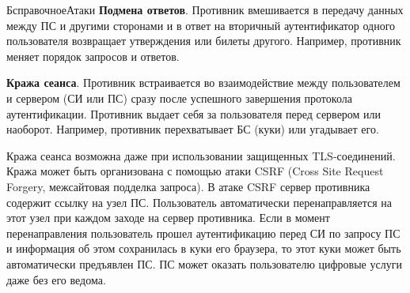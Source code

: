 \begin{appendix}{Б}{справочное}{Атаки}
{\bf Подмена ответов}.
Противник вмешивается в передачу данных между ПС и другими сторонами 
и в ответ на вторичный аутентификатор одного пользователя
возвращает утверждения или билеты другого.
%
Например, противник меняет порядок запросов и ответов.


{\bf Кража сеанса}. 
Противник встраивается во взаимодействие между пользователем 
и сервером (СИ или ПС) сразу после успешного завершения протокола 
аутентификации. Противник выдает себя за пользователя перед сервером 
или наоборот. 
%
Например, противник перехватывает БС (куки) или угадывает его. 


\begin{note*}
Кража сеанса возможна даже при использовании защищенных TLS-соединений. 
Кража может быть организована с помощью атаки CSRF (Cross Site Request 
Forgery, межсайтовая подделка запроса). В атаке CSRF сервер противника 
содержит ссылку на узел ПС. Пользователь автоматически перенаправляется 
на этот узел при каждом заходе на сервер противника. 
Если в момент перенаправления пользователь прошел аутентификацию
перед СИ по запросу ПС и информация об этом сохранилась в куки его браузера,
то этот куки может быть автоматически предъявлен ПС.
%
ПС может оказать пользователю цифровые услуги даже без его ведома.
%
\end{note*}

\end{appendix}